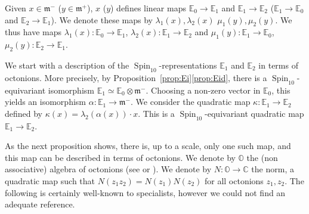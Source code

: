 \documentclass[JEP,XML,SOM,Unicode,NoFloatCountersInSection]{cedram}
\newcommand{\citestar}[3]{\cite[#3]{#1}}
\theoremstyle{plain}
\theoremstyle{definition}
\DeclareMathOperator{\Spin}{Spin}
\newcommand{\bC}{\mathbb{C}}
\newcommand{\bE}{\mathbb{E}}
\newcommand{\bO}{\mathbb{O}}
\newcommand{\fm}{\mathfrak{m}}
\begin{document}
Given $x \in \fm^-$ (\resp $y \in \fm^+$), $x$ (\resp $y$) defines linear maps $\bE_0 \to \bE_1$ and $\bE_1 \to \bE_2$ (\resp $\bE_1 \to \bE_0$ and $\bE_2 \to \bE_1$). We denote these maps by $\lambda_1(x),\lambda_2(x)$
\resp $\mu_1(y),\mu_2(y)$. We thus have maps
$\lambda_1(x):\bE_0 \to \bE_1$, $\lambda_2(x):\bE_1 \to \bE_2$ and
\hbox{$\mu_1(y):\bE_1 \to \bE_0$}, $\mu_2(y):\bE_2 \to \bE_1$.

We start with a description of the $\Spin_{10}$-representations $\bE_1$ and $\bE_2$ in terms of octonions.
More precisely, by Proposition~\ref{prop:Ei}\eqref{prop:Eid}, there is a $\Spin_{10}$-equivariant isomorphism
$\bE_1 \simeq \bE_0 \otimes \fm^-$.
Choosing a non-zero vector in $\bE_0$, this yields an isomorphism $\alpha: \bE_1 \to \fm^-$.
We consider the quadratic map $\kappa: \bE_1 \to \bE_2$ defined by
$\kappa(x)=\lambda_2(\alpha(x)) \cdot x$. This is a $\Spin_{10}$-equivariant quadratic map $\bE_1 \to \bE_2$.

As the next proposition shows, there is, up to a scale, only one such map, and this map
can be described in terms of octonions. We denote by $\bO$ the (non associative) algebra
of octonions (see \citestar{chevalley}*{} or \cite{springer}).
We denote by $N: \bO \to \bC$ the norm, a quadratic map such that
$N(z_1z_2)=N(z_1)N(z_2)$ for all octonions $z_1,z_2$.
The following is certainly well-known to specialists, however we could not find an adequate reference.
\end{document}
